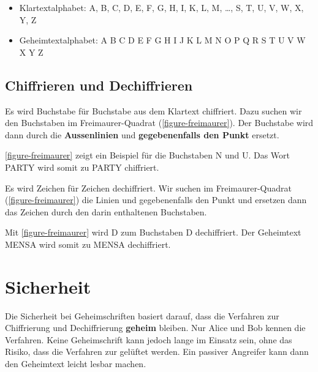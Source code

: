 \begin{itemize}
\item Klartextalphabet: A, B, C, D, E, F, G, H, I, K, L, M, \dots , S, T, U, V, W, X, Y, Z
\item Geheimtextalphabet: {\pigpenfont A \pigpenfont B \pigpenfont C \pigpenfont D \pigpenfont E \pigpenfont F \pigpenfont G \pigpenfont H \pigpenfont I \pigpenfont J \pigpenfont K \pigpenfont L \pigpenfont M \pigpenfont N \pigpenfont O \pigpenfont P \pigpenfont Q \pigpenfont R \pigpenfont S \pigpenfont T \pigpenfont U \pigpenfont V \pigpenfont W \pigpenfont X \pigpenfont Y \pigpenfont Z}
\end{itemize}

\subsection{Chiffrieren und Dechiffrieren}

Es wird Buchstabe für Buchstabe aus dem Klartext chiffriert. Dazu suchen wir den Buchstaben im Freimaurer-Quadrat (\autoref{figure-freimaurer}). Der Buchstabe wird dann durch die \textbf{Aussenlinien} und \textbf{gegebenenfalls den Punkt} ersetzt.

\begin{example}
\autoref{figure-freimaurer} zeigt ein Beispiel für die Buchstaben N und U. Das Wort PARTY wird somit zu {\pigpenfont PARTY} chiffriert.
\end{example}

Es wird Zeichen für Zeichen dechiffriert. Wir suchen im Freimaurer-Quadrat (\autoref{figure-freimaurer}) die Linien und gegebenenfalls den Punkt und ersetzen dann das Zeichen durch den darin enthaltenen Buchstaben.

\begin{example}
Mit \autoref{figure-freimaurer} wird {\pigpenfont D} zum Buchstaben D dechiffriert. Der Geheimtext {\pigpenfont MENSA} wird somit zu MENSA dechiffriert.
\end{example}

\section{Sicherheit}
\label{section-geheimschriften-sicherheit}

Die Sicherheit bei Geheimschriften basiert darauf, dass die Verfahren zur Chiffrierung und Dechiffrierung \textbf{geheim} bleiben. Nur Alice und Bob kennen die Verfahren. Keine Geheimschrift kann jedoch lange im Einsatz sein, ohne das Risiko, dass die Verfahren zur gelüftet werden. Ein passiver Angreifer kann dann den Geheimtext leicht lesbar machen.

